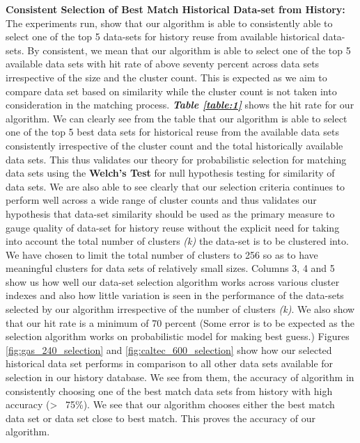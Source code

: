 \textbf{Consistent Selection of Best Match Historical Data-set from History:} The experiments run, show that our algorithm is able to consistently able to select one of the top 5 data-sets for history reuse from available historical data-sets. By consistent, we mean that our algorithm is able to select one of the top 5 available data sets with hit rate of above seventy percent across data sets irrespective of the size and the cluster count. This is expected as we aim to compare data set based on similarity while the cluster count is not taken into consideration in the matching process. \textbf{\textit{Table \ref{table:1}}} shows the hit rate for our algorithm.
We can clearly see from the table that our algorithm is able to select one of the top 5 best data sets for historical reuse from the available data sets consistently irrespective of the cluster count and the total historically available data sets. 
This thus validates our theory for probabilistic selection for matching data sets using the \textbf{Welch's Test} for null hypothesis testing for similarity of data sets. We are also able to see clearly that our selection criteria continues to perform well across a wide range of cluster counts and thus validates our hypothesis that data-set similarity should be used as the primary measure to gauge quality of data-set for history reuse without the explicit need for taking into account the total number of clusters \textit{(k)} the data-set is to be clustered into. We have chosen to limit the total number of clusters to 256 so as to have meaningful clusters for data sets of relatively small sizes.
Columns 3, 4 and 5 show us how well our data-set selection algorithm works across various cluster indexes and also how little variation is seen in the performance of the data-sets selected by our algorithm irrespective of the number of clusters \textit{(k)}. We also show that our hit rate is a minimum of 70 percent (Some error is to be expected as the selection algorithm works on probabilistic model for making best guess.)
Figures \ref{fig:gas_240_selection} and \ref{fig:caltec_600_selection} show how our selected historical data set performs in comparison to all other data sets available for selection in our history database. We  see from them, the accuracy of algorithm in consistently choosing one of the best match data sets from history with high accuracy (>~ 75\%). We see that our algorithm chooses either the best match data set or data set close to best match. This proves the accuracy of our algorithm.
